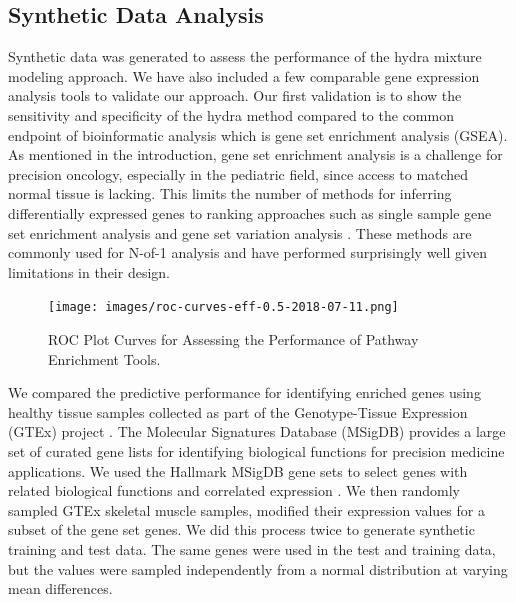 \documentclass[fleqn,10pt]{wlscirep}
\begin{document}
\subsection*{Synthetic Data Analysis}
Synthetic data was generated to assess the performance of the hydra mixture modeling approach. We have also included a few comparable gene expression analysis tools to validate our approach. Our first validation is to show the sensitivity and specificity of the hydra method compared to the common endpoint of bioinformatic analysis which is gene set enrichment analysis (GSEA). As mentioned in the introduction, gene set enrichment analysis is a challenge for precision oncology, especially in the pediatric field, since access to matched normal tissue is lacking. This limits the number of methods for inferring differentially expressed genes to ranking approaches such as single sample gene set enrichment analysis \cite{barbie2009systematic} and gene set variation analysis \cite{hanzelmann2013gsva}. These methods are commonly used for N-of-1 analysis and have performed surprisingly well given limitations in their design.


\begin{figure}
	\centering
	\texttt{[image: images/roc-curves-eff-0.5-2018-07-11.png]}
	\caption{ROC Plot Curves for Assessing the Performance of Pathway Enrichment Tools.}
	\label{sfig:rocplot}
\end{figure}

We compared the predictive performance for identifying enriched genes using healthy tissue samples collected as part of the Genotype-Tissue Expression (GTEx) project \cite{lonsdale2013genotype}. The Molecular Signatures Database (MSigDB) provides a large set of curated gene lists for identifying biological functions for precision medicine applications. We used the Hallmark MSigDB gene sets to select genes with related biological functions and correlated expression \cite{liberzon2015molecular}. We then randomly sampled GTEx skeletal muscle samples, modified their expression values for a subset of the gene set genes. We did this process twice to generate synthetic training and test data. The same genes were used in the test and training data, but the values were sampled independently from a normal distribution at varying mean differences. 
\end{document}
